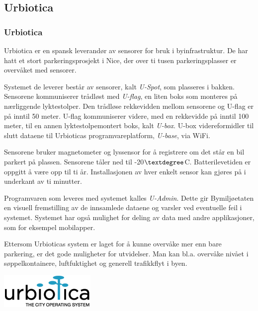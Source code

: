 \documentclass[xetex]{beamer}
\begin{document}
\begin{frame}\label{fr:urbiotica}
	\subsection{Urbiotica}
	\frametitle{\alert{Urbiotica}}
	Urbiotica er en \alert{spansk} leverandør av sensorer for bruk i byinfrastruktur. De har hatt et stort parkeringsprosjekt i \alert{Nice}, der over \alert{ti tusen} parkeringsplasser er overvåket med sensorer.
	
	Systemet de leverer består av sensorer, kalt \alert{\emph{U-Spot}}, som plasseres i bakken. Sensorene kommuniserer trådløst med \alert{\emph{U-flag}}, en liten boks som monteres på nærliggende lyktestolper. Den trådløse rekkevidden mellom sensorene og U-flag er på inntil 50 meter. U-flag kommuniserer videre, med en rekkevidde på inntil 100 meter, til en annen lyktestolpemontert boks, kalt \alert{\emph{U-box}}. U-box videreformidler til slutt dataene til Urbioticas programvareplatform, \alert{\emph{U-base}}, via WiFi.
	
	
	Sensorene bruker \alert{magnetometer og lyssensor} for å registrere om det står en bil parkert på plassen. Sensorene tåler ned til \alert{-20$\textdegree$C}. Batterilevetiden er oppgitt å være opp til \alert{ti år}. Installasjonen av hver enkelt sensor kan gjøres på i underkant av \alert{ti minutter}.

	Programvaren som leveres med systemet kalles \alert{\emph{U-Admin}}. Dette gir Bymiljøetaten en \alert{visuell fremstilling} av de innsamlede dataene og \alert{varsler ved eventuelle feil} i systemet. Systemet har også mulighet for \alert{deling av data} med andre applikasjoner, som for eksempel \alert{mobilapper}. 
	
		Ettersom Urbioticas system er laget for å kunne overvåke mer enn bare parkering, er det gode muligheter for \alert{utvidelser}. Man kan bl.a. overvåke nivået i søppelkontainere, luftfuktighet og generell trafikkflyt i byen.
	
	\vfill\hfill\includegraphics[scale=0.2]{grafikk/logoer/urbiotica.jpg}
\end{frame}
\end{document}
